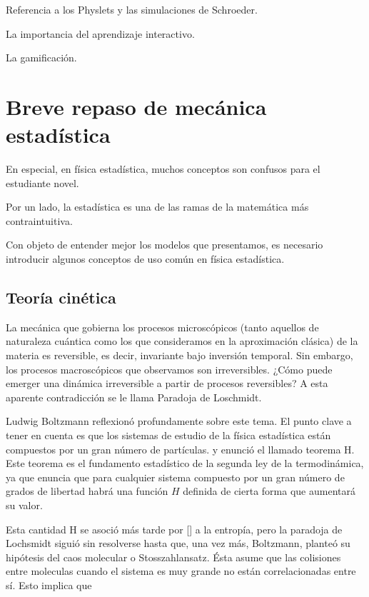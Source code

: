 \documentclass[11pt, a4paper]{article} %
\theoremstyle{named}
\begin{document}
Referencia a los Physlets y las simulaciones de Schroeder.

La importancia del aprendizaje interactivo.

La gamificación.

\section{Breve repaso de mecánica estadística}\label{sec:fises}

En especial, en física estadística, muchos conceptos son confusos para el estudiante novel.

Por un lado, la estadística es una de las ramas de la matemática más contraintuitiva.

Con objeto de entender mejor los modelos que presentamos, es necesario introducir algunos conceptos de uso común en física estadística.


\subsection{Teoría cinética}

La mecánica que gobierna los procesos microscópicos (tanto aquellos de naturaleza cuántica como los que consideramos en la aproximación clásica) de la materia es reversible, es decir, invariante bajo inversión temporal. Sin embargo, los procesos macroscópicos que observamos son irreversibles. ¿Cómo puede emerger una dinámica irreversible a partir de procesos reversibles? A esta aparente contradicción se le llama Paradoja de Loschmidt.

Ludwig Boltzmann reflexionó profundamente sobre este tema. El punto clave a tener en cuenta es que los sistemas de estudio de la física estadística están compuestos por un gran número de partículas. y enunció el llamado teorema H. Este teorema es el fundamento estadístico de la segunda ley de la termodinámica, ya que enuncia que para cualquier sistema compuesto por un gran número de grados de libertad habrá una función $H$ definida de cierta forma que aumentará su valor.

Esta cantidad H se asoció más tarde por [] a la entropía, pero la paradoja de Lochsmidt siguió sin resolverse hasta que, una vez más, Boltzmann, planteó su hipótesis del caos molecular o Stosszahlansatz. Ésta asume que las colisiones entre moleculas cuando el sistema es muy grande no están correlacionadas entre sí. Esto implica que
\end{document}
